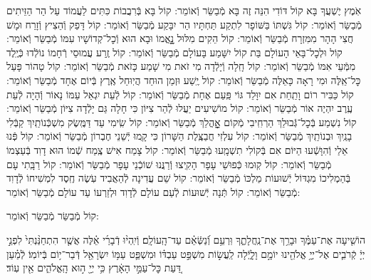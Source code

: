 \documentclass[twoside, openany, parskip=half, 11pt]{book}
\begin{document}
\begin{small}
אֹֽמֶץ יֶשְׁעֲךָ בָּא קוֹל דּוֹדִי הִנֵּה זֶה בָּא מְֿבַשֵּׂר וְֿאוֹמֵר:
קוֹל בָּא בְּֿרִבֲבוֹת כִּתִּים לַעֲמוֹד עַל הַר הַזֵּיתִים מְֿבַשֵּׂר וְֿאוֹמֵר:
קוֹל גִּשְׁתּוֹ בַּשּׁוֹפָר לִתְקַע תַּחְתָּיו הַר יִבָּקַע מְֿבַשֵּׂר וְֿאוֹמֵר:
קוֹל דָּפַק וְֿהֵצִיץ וְֿזָרַח וּמָשׁ חֲצִי הָהָר מִמִּזְרָח מְֿבַשֵּׂר וְֿאוֹמֵר:
קוֹל הֵקִים מִלּוּל נׇׇׇָאֳמוֹ וּבָא הוּא וְֿכׇל־קְדוֹשָׁיו עִמּוֹ מְֿבַשֵּׂר וְֿאוֹמֵר:
קוֹל וּלְכׇל־בָּאֵי הָעוֹלָם בַּת קוֹל יִשָּׁמַע בָּעוֹלָם מְֿבַשֵּׂר וְֿאוֹמֵר:
קוֹל זֶֽרַע עֲמוּסֵי רְֿחָמוֹ נוֹלְֿדוּ כְּֿיֶֽלֶד מִמְּֿעֵי אִמּוֹ מְֿבַשֵּׂר וְֿאוֹמֵר:
קוֹל חָֽלָה וְֿיָלְֿדָה מִי זֹאת מִי שָׁמַע כָּזֹאת מְֿבַשֵּׂר וְֿאוֹמֵר:
קוֹל טָהוֹר פָּעַל כׇּל־אֵֽלֶּה וּמִי רָאָה כָּאֵלֶּה מְֿבַשֵּׂר וְֿאוֹמֵר:
קוֹל יֶֽשַׁע וּזְמַן הוּחַד הֲיֽוּחַל אֶֽרֶץ בְּֿיוֹם אֶחָד מְֿבַשֵּׂר וְֿאוֹמֵר:
קוֹל כַּבִּיר רוֹם וָתַֽחַת אִם יִוָּלֵד גּוֹי פַּֽעַם אֶחָת מְֿבַשֵּׂר וְֿאוֹמֵר:
קוֹל לְֿעֵת יִגְאַל עַמּוֹ נָאוֹר וְֿהָיָה לְֿעֵת עֶֽרֶב יִהְיֶה אוֹר מְֿבַשֵּׂר וְֿאוֹמֵר:
קוֹל מוֹשִׁיעִים יַעֲלוּ לְֿהַר צִיּוֹן כִּי חָלָה גַּם יָלְֿדָה צִיּוֹן מְֿבַשֵּׂר וְֿאוֹמֵר:
קוֹל נִשְׁמַע בְּֿכׇל־גְּֿבוּלֵךְ הַרְחִֽיבִי מְֿקוֹם אׇׇׇׇׇָהֳלֵךְ מְֿבַשֵּׂר וְֿאוֹמֵר:
קוֹל שִֽׂימִי עַד דַּמֶּֽשֶׂק מִשְׁכְּֿנוֹתַֽיִךְ קַבְּֿלִי בָנַֽיִךְ וּבְנוֹתַֽיִךְ מְֿבַשֵּׂר וְֿאוֹמֵר:
קוֹל עִלְזִי חֲבַצֶּֽלֶת הַשָּׁרוֹן כִּי קָֽמוּ יְֿשֵׁנֵי חֶבְרוֹן מְֿבַשֵּׂר וְֿאוֹמֵר:
קוֹל פְּֿנוּ אֵלַי וְֿהִוָּשְֿׁעוּ הַיּוֹם אִם בְּֿקוֹלִי תִשְׁמָֽעוּ מְֿבַשֵּׂר וְֿאוֹמֵר:
קוֹל צָמַח אִישׁ צֶֽמַח שְֿׁמוֹ הוּא דָוִד בְּֿעַצְמוֹ מְֿבַשֵּׂר וְֿאוֹמֵר:
קוֹל קֽוּמוּ כְּֿפוּשֵׁי עָפָר הָקִֽיצוּ וְֿרַנֲּנוּ שׁוֹכְֿנֵי עָפָר מְֿבַשֵּׂר וְֿאוֹמֵר:
קוֹל רַבָּֽתִי עָם בְּֿהַמְלִיכוֹ מִגְדּוֹל יְֿשׁוּעוֹת מַלְכּוֹ מְֿבַשֵּׂר וְֿאוֹמֵר:
קוֹל שֵׁם עֲדִינָה לְֿהַאֲבִיד עֹֽשֶׂה חֶֽסֶד לִמְשִׁיחוֹ לְֿדָוִד מְֿבַשֵּׂר וְֿאוֹמֵר:
קוֹל תְּֿנָה יְֿשׁוּעוֹת לְֿעַם עוֹלָם לְֿדָוִד וּלְזַרְעוֹ עַד עוֹלָם מְֿבַשֵּׂר וְֿאוֹמֵר:

\end{small}

\begin{large}
קוֹל מְֿבַשֵּׂר מְֿבַשֵּׂר וְֿאוֹמֵר:

\end{large}

הוֹשִׁ֤יעָה אֶת־עַמֶּ֗ךָ וּבָרֵ֥ךְ אֶת־נַֽחֲלָתֶ֑ךָ וּֽרְעֵ֥ם וְֿ֝נַשְּֿׂאֵ֗ם עַד־הָֽעוֹלָֽם׃ וְֿיִֽהְי֨וּ דְֿבָרַ֜י אֵ֗לֶּה אֲשֶׁ֤ר הִתְחַנַּ֨נְתִּי֙ לִפְנֵ֣י יְיָ֔ קְֿרֹבִ֛ים אֶל־יְיָ֥ אֱלֹהֵ֖ינוּ יוֹמָ֣ם וָלָ֑יְֿלָה לַֽעֲשׂ֣וֹת מִשְׁפַּ֣ט עַבְדּ֗וֹ וּמִשְׁפַּ֛ט עַמּ֥וֹ יִשְׂרָאֵ֖ל דְּֿבַר־י֥וֹם בְּֿיוֹמֽוֹ׃ לְֿמַ֗עַן דַּ֚עַת כׇּל־עַמֵּ֣י הָאָ֔רֶץ כִּ֥י יְיָ֖ ה֣וּא הָֽאֱלֹהִ֑ים אֵ֖ין עֽוֹד׃

\end{document}
